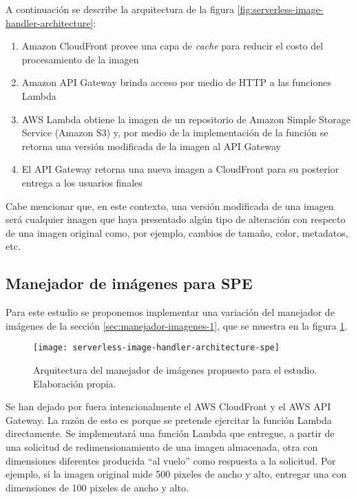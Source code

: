 A continuación se describe la arquitectura de la figura \ref{fig:serverless-image-handler-architecture}:
\begin{enumerate}
    \item Amazon CloudFront provee una capa de \emph{cache} para reducir el costo del procesamiento de la imagen
    \item Amazon API Gateway brinda acceso por medio de HTTP a las funciones Lambda
    \item AWS Lambda obtiene la imagen de un repositorio de Amazon Simple Storage Service (Amazon S3) y, por medio de la implementación de la función se retorna una versión modificada de la imagen al API Gateway
    \item El API Gateway retorna una nueva imagen a CloudFront para su posterior entrega a los usuarios finales
\end{enumerate}

Cabe mencionar que, en este contexto, una versión modificada de una imagen será cualquier imagen que haya presentado algún tipo de alteración con respecto de una imagen original como, por ejemplo, cambios de tamaño, color, metadatos, etc.

\subsection{Manejador de imágenes para SPE} \label{sec:manejador-imagenes-spe}
Para este estudio se proponemos implementar una variación del manejador de imágenes de la sección \ref{sec:manejador-imagenes-1}, que se muestra en la figura \ref{fig:serverless-image-handler-architecture-spe}.

\begin{figure}[h]
  \centering
  \texttt{[image: serverless-image-handler-architecture-spe]}
  \caption[Arquitectura del manejador de imágenes propuesto para el estudio]{Arquitectura del manejador de imágenes propuesto para el estudio. Elaboración propia.}
  \label{fig:serverless-image-handler-architecture-spe}
\end{figure}

Se han dejado por fuera intencionalmente el AWS CloudFront y el AWS API Gateway. La razón de esto es porque se pretende ejercitar la función Lambda directamente. Se implementará una función Lambda que entregue, a partir de una solicitud de redimensionamiento de una imagen almacenada, otra con dimensiones diferentes producida ``al vuelo'' como respuesta a la solicitud. Por ejemplo, si la imagen original mide 500 pixeles de ancho y alto, entregar una con dimensiones de 100 pixeles de ancho y alto. 

